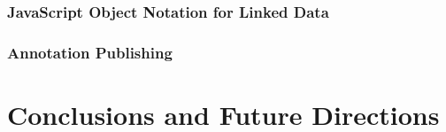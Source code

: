 \documentclass[12pt,a4paper,twoside]{report}
\begin{document}
      \subsubsection{JavaScript Object Notation for Linked Data}
        \label{sec:json}
        

      \subsubsection{Annotation Publishing}
        \label{sec:pub}
        

  \clearpage

  \section{Conclusions and Future Directions}
    \label{sec:outro}
    

  
  
\end{document}
